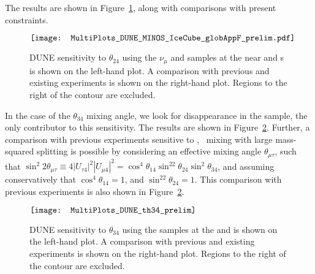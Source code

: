 The results are shown in Figure~\ref{th_24}, along with comparisons with present constraints.
\begin{figure}[!htbp]
\centering
$\vcenter{\hbox{\texttt{[image: MultiPlots\_DUNE\_MINOS\_IceCube\_globAppF\_prelim.pdf]}}}$
\caption[Sensitivity to $\theta_{24}$ using the $\nu_\mu$  and  samples at near and s]{DUNE sensitivity to $\theta_{24}$ using the $\nu_\mu$  and  samples at the near and s is shown on the left-hand plot. A comparison with previous and existing experiments is shown on the right-hand plot. Regions to the right of the contour are excluded.}
\label{th_24}
\end{figure}
    In the case of the $\theta_{34}$ mixing angle, we look for disappearance in the  sample, the only contributor to this sensitivity. 
    The results are shown in Figure~\ref{th_34}. Further, a comparison with previous experiments sensitive to \numu, \nutau~mixing with large mass-squared splitting is possible by considering an effective mixing angle $\theta_{\mu\tau}$, such that $\sin^2{2\theta_{\mu\tau}}\equiv 4|U_{\tau4}|^2|U_{\mu 4}|^2=\cos^4\theta_{14}\sin^22\theta_{24}\sin^2\theta_{34}$, and assuming conservatively that $\cos^4\theta_{14}=1$, and $\sin^22\theta_{24}=1$. This comparison with previous experiments is also shown in Figure~\ref{th_34}.
\begin{figure}
\centering
$\vcenter{\hbox{\texttt{[image: MultiPlots\_DUNE\_th34\_prelim]}}}$
\caption[Sensitivity to $\theta_{34}$ using the  samples at the   and ]{DUNE sensitivity to $\theta_{34}$ using the  samples at the  and  is shown on the left-hand plot. A comparison with previous and existing experiments is shown on the right-hand plot. Regions to the right of the contour are excluded.}
\label{th_34}
\end{figure}

